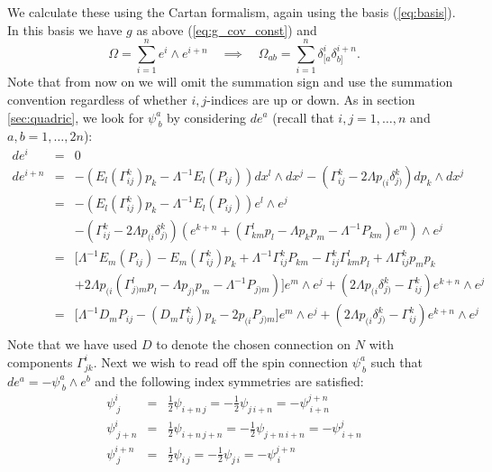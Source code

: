We calculate these using the Cartan formalism, again using the basis
(\ref{eq:basis}). In this basis we have $g$ as above (\ref{eq:g_cov_const})
and
\[
\Omega=\sum_{i=1}^{n}e^{i}\wedge e^{i+n}\quad\implies\quad\Omega_{ab}=\sum_{i=1}^{n}\delta_{[a}^{i}\delta_{b]}^{i+n}.
\]
Note that from now on we will omit the summation sign and use the
summation convention regardless of whether $i,j$-indices are up or
down. As in section \ref{sec:quadric}, we look for $\psi_{\ b}^{a}$
by considering $ de^{a}$ (recall that $i,j=1,\dots,n$ and
$a,b=1,\dots,2n$):
\begin{eqnarray*}
 de^{i} & = & 0\\
 de^{i+n} & = & -(E_{l}(\Gamma_{ij}^{k})p_{k}-\Lambda^{-1}E_{l}(P_{ij})) dx^{l}\wedge dx^{j}-(\Gamma_{ij}^{k}-2\Lambda p_{(i}\delta_{j)}^{k}) dp_{k}\wedge dx^{j}\\
 & = & -(E_{l}(\Gamma_{ij}^{k})p_{k}-\Lambda^{-1}E_{l}(P_{ij}))e^{l}\wedge e^{j}\\
 &  & -(\Gamma_{ij}^{k}-2\Lambda p_{(i}\delta_{j)}^{k})(e^{k+n}+(\Gamma_{km}^{l}p_{l}-\Lambda p_{k}p_{m}-\Lambda^{-1}P_{km})e^{m})\wedge e^{j}\\
 & = & \bigl[\Lambda^{-1}E_{m}(P_{ij})-E_{m}(\Gamma_{ij}^{k})p_{k}+\Lambda^{-1}\Gamma_{ij}^{k}P_{km}-\Gamma_{ij}^{k}\Gamma_{km}^{l}p_{l}+\Lambda\Gamma_{ij}^{k}p_{m}p_{k}\\
 &  & +2\Lambda p_{(i}(\Gamma_{j)m}^{l}p_{l}-\Lambda p_{j)}p_{m}-\Lambda^{-1}P_{j)m})\bigr]e^{m}\wedge e^{j}+(2\Lambda p_{(i}\delta_{j)}^{k}-\Gamma_{ij}^{k})e^{k+n}\wedge e^{j}\\
 & = & \bigl[\Lambda^{-1}D_{m}P_{ij}-(D_{m}\Gamma_{ij}^{k})p_{k}-2p_{(i}P_{j)m}\bigr]e^{m}\wedge e^{j}+(2\Lambda p_{(i}\delta_{j)}^{k}-\Gamma_{ij}^{k})e^{k+n}\wedge e^{j}\\
\end{eqnarray*}
Note that we have used $D$ to denote the chosen connection on $N$
with components $\Gamma_{jk}^{i}$. Next we wish to read off the spin
connection $\psi_{\ b}^{a}$ such that ${d}e^{a}=-\psi_{\ b}^{a}\wedge e^{b}$
and the following index symmetries are satisfied:
\begin{eqnarray*}
\psi_{\ j}^{i} & = & \frac{1}{2}\psi_{i+n\, j}=-\frac{1}{2}\psi_{j\, i+n}=-\psi_{\ i+n}^{j+n}\\
\psi_{\ j+n}^{i} & = & \frac{1}{2}\psi_{i+n\, j+n}=-\frac{1}{2}\psi_{j+n\, i+n}=-\psi_{\ i+n}^{j}\\
\psi_{\ j}^{i+n} & = & \frac{1}{2}\psi_{i\, j}=-\frac{1}{2}\psi_{j\, i}=-\psi_{\ i}^{j+n}
\end{eqnarray*}
